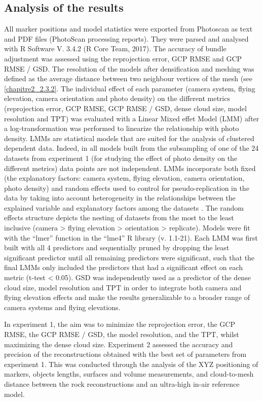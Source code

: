 \subsection{Analysis of the results}\label{chapitre2_2.4}
All marker positions and model statistics were exported from Photoscan as text and PDF files (PhotoScan processing reports). They were parsed and analysed with R Software V. 3.4.2 (R Core Team, 2017). The accuracy of bundle adjustment was assessed using the reprojection error, GCP RMSE and GCP RMSE / GSD. The resolution of the models after densification and meshing was defined as the average distance between two neighbour vertices of the mesh (see \autoref{chapitre2_2.3.2}. The individual effect of each parameter (camera system, flying elevation, camera orientation and photo density) on the different metrics (reprojection error, GCP RMSE, GCP RMSE / GSD, dense cloud size, model resolution and TPT) was evaluated with a Linear Mixed effet Model (LMM) \citep{zuur_mixed_2009} after a log-transformation was performed to linearize the relationship with photo density. LMMs are statistical models that are suited for the analysis of clustered dependent data. Indeed, in all models built from the subsampling of one of the 24 datasets from experiment 1 (for studying the effect of photo density on the different metrics) data points are not independent. LMMs incorporate both fixed (the explanatory factors: camera system, flying elevation, camera orientation, photo density) and random effects used to control for pseudo-replication in the data by taking into account heterogeneity in the relationships between the explained variable and explanatory factors among the datasets \citep{patino_accounting_2013}. The random effects structure depicts the nesting of datasets from the most to the least inclusive (camera > flying elevation > orientation > replicate). Models were fit with the “lmer” function in the “lme4” R library (v. 1.1-21). Each LMM was first built with all 4 predictors and sequentially pruned by dropping the least significant predictor until all remaining predictors were significant, such that the final LMMs only included the predictors that had a significant effect on each metric (t-test < 0.05). GSD was independently used as a predictor of the dense cloud size, model resolution and TPT in order to integrate both camera and flying elevation effects and make the results generalizable to a broader range of camera systems and flying elevations.

In experiment 1, the aim was to minimize the reprojection error, the GCP RMSE, the GCP RMSE / GSD, the model resolution, and the TPT, whilst maximizing the dense cloud size. Experiment 2 assessed the accuracy and precision of the reconstructions obtained with the best set of parameters from experiment 1. This was conducted through the analysis of the XYZ positioning of markers, objects lengths, surfaces and volume measurements, and cloud-to-mesh distance between the rock reconstructions and an ultra-high in-air reference model.

